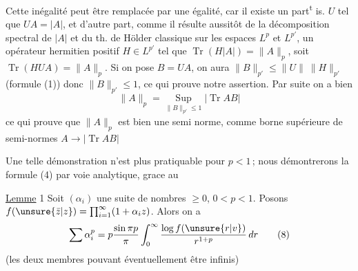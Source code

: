 Cette inégalité peut être remplacée par une égalité,
car il existe un  part\textsuperscript{t} is. $U$ tel que
$UA=|A|$,  et d'autre part, comme il
résulte aussitôt de la décomposition spectral de
$|A|$ et du th. de Hölder classique sur les
espaces $L^p$ et $L^{p'}$, un opérateur hermitien
positif $H\in L^{p'}$ tel que $\operatorname{Tr}(H|A|)=\|A\|_p$,
soit \deleted{\unsure{$|$}}$\operatorname{Tr}(HUA)$\deleted{\unsure{$|$}}$=\|A\|_p$. Si on pose
$B=UA$, on aura $\|B\|_{p'}\leq\|U\|\ \|H\|_{p'}$ (formule
(1)) donc $\|B\|_{p'}\leq1$, ce qui prouve notre assertion.
Par suite on a bien
\[
\|A\|_p=\operatorname*{Sup}_{\|B\|_{p'}\leq1}|\operatorname{Tr}AB|\tag*{(7)}
\]
ce qui prouve que $\|A\|_p$ est bien une
semi norme, comme borne supérieure de
semi-normes $A\to|\operatorname{Tr}AB|$

Une telle démonstration n'est plus pratiquable
pour $p<1$\,;  nous démontrerons la formule (4)
par voie analytique, grace au

\uline{Lemme} 1 \quad Soit $(\alpha_i)$ une suite   de
\margin{\rule[-3.9cm]{0.4pt}{4.1cm}}nombres $\geq0$, 
  $0<p<1$. Posons $f(\unsure{\bar z|z})=\prod_{i=1}^{\infty}(1+\alpha_i z)$.
Alors on a
\[
\sum\alpha_i^p=p\frac{\sin\pi p}{\pi}\int_0^\infty\frac{\log f(\unsure{r|v})}{r^{1+p}}\,dr\tag*{(8)}
\]
(les deux membres pouvant éventuellement
être infinis)
